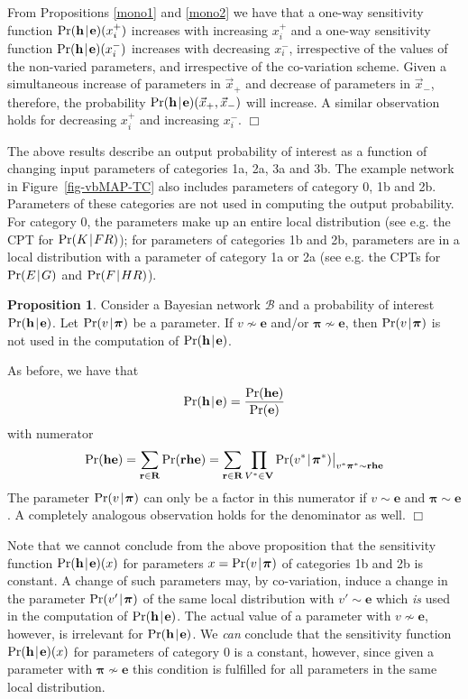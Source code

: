 \documentclass[10pt,a4paper]{paper}
\theoremstyle{definition}
\newtheorem{prop}[theorem]{Proposition}
\newcommand{\bpi}{\boldsymbol\pi}
\newcommand{\vbpi}{\boldsymbol\pi}
\newcommand{\hyp}{\mathbf{h}}
\newcommand{\ev}{\mathbf{e}}
\newcommand{\giv}[1]{\big\vert_{#1}}
\newcommand{\newmid}{\hspace{0.9pt}\vert\hspace{0.9pt}}
\begin{document}
From Propositions \ref{mono1} and \ref{mono2} we have that a one-way sensitivity function $\Pr(\hyp\newmid\ev)(x_i^+)$ increases with increasing $x_i^+$ and a one-way sensitivity function $\Pr(\hyp\newmid\ev)(x_i^-)$ increases with decreasing $x_i^-$, irrespective of the values of the non-varied parameters, and irrespective of the co-variation scheme. Given a simultaneous increase of parameters in $\vec{x}_+$ and decrease of parameters in $\vec{x}_-$, therefore, the probability $\Pr(\hyp\newmid\ev)(\vec{x}_+,\vec{x}_-)$ will increase. A similar observation holds for decreasing $x_i^+$ and increasing $x_i^-$. 
\hfill $\Box$

\bigskip

The above results describe an output probability of interest as a function of changing input parameters of categories 1a, 2a, 3a and 3b. The example network in Figure~\ref{fig-vbMAP-TC} also includes parameters of category 0, 1b and 2b. 
Parameters of these categories are not used in computing the output probability.
For category 0, the parameters make up an entire local distribution (see e.g. the CPT for $\Pr(K \newmid FR)$); for parameters of categories 1b and 2b, parameters are in a local distribution with a parameter of category 1a or 2a (see e.g. the CPTs for $\Pr(E\newmid G)$ and $\Pr(F\newmid HR)$). 

\begin{prop}\label{constant}
Consider a Bayesian network ${\mathcal B}$ and a probability of interest $\Pr(\hyp\newmid \ev)$. Let $\Pr(v\newmid \bpi)$ be a parameter. If\/ $v\nsim\ev$ and/or $\bpi\nsim\ev$, then $\Pr(v\newmid \bpi)$ is not used in the computation of\/ $\Pr(\hyp\newmid \ev)$. 
\end{prop}
As before, we have that 
\[\Pr(\hyp\newmid \ev) = \frac{\Pr(\hyp\ev)}{\Pr(\ev)}\]
with numerator
\[\Pr(\hyp\ev)= \sum_{{\bf r}\in{\bf R}}\Pr({\bf r}\hyp\ev) = 
\sum_{{\bf r}\in{\bf R}} \prod_{V^*\in {\bf V}} \Pr(v^* \newmid \vbpi^*)\giv{v^*\vbpi^*\sim {\bf r}\hyp\ev} 
\]
The parameter $\Pr(v\newmid \bpi)$ can only be a factor in this numerator if $v\sim\ev$ and $\bpi\sim\ev$. 
A completely analogous observation holds for the denominator as well. \hfill $\Box$
 
\bigskip
Note that we cannot conclude from the above proposition that the sensitivity function $\Pr(\hyp\newmid \ev)(x)$ for parameters $x=\Pr(v\newmid \bpi)$ of categories 1b and 2b is constant. A change of such parameters may, by co-variation, induce a change in the parameter $\Pr(v'\newmid \bpi)$ of the same local distribution with $v'\sim\ev$ which \emph{is} used in the computation of $\Pr(\hyp\newmid \ev)$. The actual value of a parameter with $v\nsim\ev$, however, is irrelevant for $\Pr(\hyp\newmid \ev)$. 
We {\em can} conclude that the sensitivity function $\Pr(\hyp\newmid\ev)(x)$ for parameters of category 0 is a constant, however, since given a parameter with $\bpi\nsim\ev$ this condition is fulfilled for all parameters in the same local distribution. 
\end{document}
